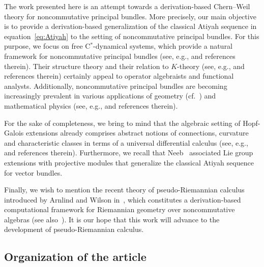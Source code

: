 \documentclass[10pt,a4paper]{amsart}
\numberwithin{equation}{section}
\newcommand*{\Star}{$^*$\nobreakdash}
\begin{document}
The work presented here is an attempt towards a derivation-based Chern--Weil theory for noncommutative principal bundles.
More precisely, our main objective is to provide a derivation-based generalization of the classical Atiyah sequence in equation~\eqref{eq:Atiyah} to the setting of noncommutative principal bundles.
For this purpose, we focus on free C\Star-dynamical systems, which provide a natural framework for noncommutative principal bundles (see, e.g., \cite{BaCoHa15,Ell00,Phi87,SchWa17c} and references therein).
Their structure theory and their relation to $K$-theory (see, e.g., \cite{CoYa13a,ForRen19,SchWa17a,SchWa17b,SchWa17c} and references therein) certainly appeal to operator algebraists and functional analysts.
Additionally, noncommutative principal bundles are becoming increasingly prevalent in various applications of geometry (cf.~\cite{IoMa16,Ivan17,Meir18,SchWa20,SchWa21}) and mathematical physics (see, e.g., \cite{BaHa-etal07,CacMes19,DaSi13,DaSiZu14,EchNeOy09,HaMa10,LaSu05,Wahl10} and references therein).

For the sake of completeness, we bring to mind that the algebraic setting of Hopf-Galois extensions already comprises abstract notions of connections, curvature and characteristic classes in terms of a universal differential calculus (see, e.g.,~\cite{BeMA20,Bre04,DGH01} and references therein).
Furthermore, we recall that Neeb~\cite{Neeb08} associated Lie group extensions with projective modules that generalize the classical Atiyah sequence for vector bundles.

Finally, we wish to mention the recent theory of pseudo-Riemannian calculus introduced by Arnlind and Wilson in~\cite{Jo17}, which constitutes a derivation-based computational framework for Riemannian geometry over noncommutative algebras (see also~\cite{Jo21, Jo18}).
It is our hope that this work will advance to the development of pseudo-Riemannian calculus.

\subsection*{Organization of the article}
\end{document}
